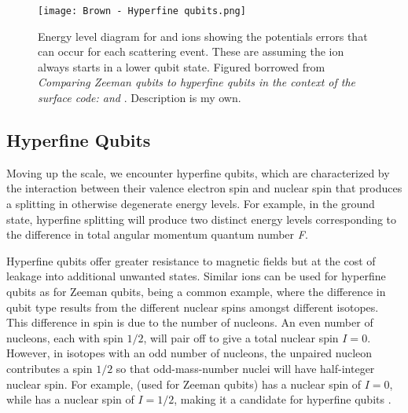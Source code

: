 \begin{figure}[!htb]
    \texttt{[image: Brown - Hyperfine qubits.png]}
    \caption{Energy level diagram for  and  ions showing the potentials errors that can occur for each scattering event. These are assuming the ion always starts in a lower qubit state. Figured borrowed from \textit{Comparing Zeeman qubits to hyperfine qubits in the context of the surface code:  and } \cite{Brown}. Description is my own.}
    \label{fig:Yb qubit}
\end{figure}

\subsection{Hyperfine Qubits}
Moving up the scale, we encounter hyperfine qubits, which are characterized by the interaction between their valence electron spin and nuclear spin that produces a splitting in otherwise degenerate energy levels. For example, in the  ground state, hyperfine splitting will produce two distinct energy levels corresponding to the difference in total angular momentum quantum number \textit{F}. 

Hyperfine qubits offer greater resistance to magnetic fields but at the cost of leakage into additional unwanted states. Similar ions can be used for hyperfine qubits as for Zeeman qubits,  being a common example, where the difference in qubit type results from the different nuclear spins amongst different isotopes. This difference in spin is due to the number of nucleons. An even number of nucleons, each with spin $1/2$, will pair off to give a total nuclear spin $I=0$. However, in isotopes with an odd number of nucleons, the unpaired nucleon contributes a spin $1/2$ so that odd-mass-number nuclei will have half-integer nuclear spin. For example,  (used for Zeeman qubits) has a nuclear spin of $I = 0$, while  has a nuclear spin of $I = 1/2$, making it a candidate for hyperfine qubits \cite{Brown}. 

